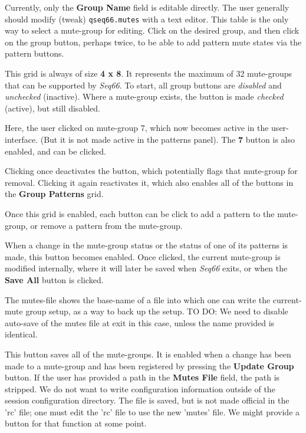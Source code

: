    Currently, only the \textbf{Group Name} field is editable directly.
   The user generally should modify (tweak)
   \texttt{qseq66.mutes} with a text editor.
   This table is the only way to select a mute-group for editing.
   Click on the desired group, and then click on the group button, perhaps
   twice, to be able to add pattern mute states via the pattern buttons.

   This grid is always of size \textbf{4 x 8}.  It represents the maximum of 32
   mute-groups that can be supported by \textsl{Seq66}.
   To start, all group buttons are \textsl{disabled} and
   \textsl{unchecked} (inactive).
   Where a mute-group exists, the button is made \textsl{checked} (active),
   but still disabled.

   Here, the user clicked on mute-group 7, which now becomes active in the
   user-interface.  (But it is not made active in the patterns panel).
   The \textbf{7} button is also enabled, and can be clicked.

   Clicking once deactivates the button, which potentially flags that mute-group
   for removal.  Clicking it again reactivates it, which also enables all of the
   buttons in the \textbf{Group Patterns} grid.

   Once this grid is enabled, each button can be click to add a pattern to the
   mute-group, or remove a pattern from the mute-group.

%
%
   When a change in the mute-group status or the status of one of its patterns
   is made, this button becomes enabled.  Once clicked, the current mute-group
   is modified internally, where it will later be saved when \textsl{Seq66}
   exits, or when the \textbf{Save All} button is clicked.

   The mutes-file shows the base-name of a file into which one can write the
   current-mute group setup, as a way to back up the setup.
   TO DO:  We need to disable auto-save of the mutes file at exit in this case,
   unless the name provided is identical.

%
%
   This button saves all of the mute-groups.
   It is enabled when a change has been made to a mute-group and
   has been registered by pressing the \textbf{Update Group} button.
   If the user has provided a path in the \textbf{Mutes File} field, the path
   is stripped.  We do not want to write configuration information outside of
   the session configuration directory.
   The file is saved, but is not made official in the
   'rc' file; one must edit the 'rc' file to use the new 'mutes' file.
   We might provide a button for that function at some point.

